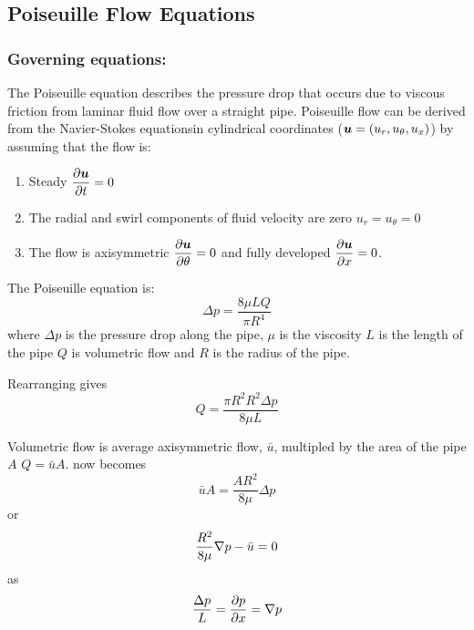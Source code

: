 \subsection{Poiseuille Flow Equations}

\subsubsection{Governing equations:}

The Poiseuille equation describes the pressure drop that occurs due to viscous
friction from laminar fluid flow over a straight pipe. Poiseuille flow can be
derived from the Navier-Stokes equationsin cylindrical coordinates
($\boldsymbol{u}=\left( u_{r},u_{\theta},u_{x} \right)$) by assuming that the flow
is: \begin{enumerate} \setlength{\itemsep}{1pt} \setlength{\parskip}{0pt}
  \setlength{\parsep}{0pt}
\item Steady \ie $ \dfrac{\partial \boldsymbol{u}}{\partial t} =0$
\item The radial and swirl components of fluid velocity are zero \ie
  $u_{r}=u_{\theta}=0$ 
\item The flow is axisymmetric \ie $ \dfrac{\partial \boldsymbol{u}}{\partial \theta} =0$ and fully developed
  \ie $ \dfrac{\partial \boldsymbol{u}}{\partial x} =0$.
\end{enumerate}

The Poiseuille equation is:
\begin{equation}
  \boxed{
    \Delta{p}=\dfrac{8\mu LQ}{\pi R^{4}}
  }
  \label{eqn:Poiseuille_equation}
\end{equation}
where $\Delta{p}$ is the pressure drop along the pipe, $\mu$ is the viscosity $L$
is the length of the pipe $Q$ is volumetric flow and $R$ is the radius of the
pipe. 

Rearranging  gives
\begin{equation}
  Q=\dfrac{\pi R^{2}R^{2}\Delta{p}}{8\mu L}
\end{equation}

Volumetric flow is average axisymmetric flow, $\bar{u}$, multipled by the area
of the pipe $A$ \ie $Q=\bar{u}A$.  now becomes
\begin{equation}
  \bar{u}A=\dfrac{AR^{2}}{8\mu}\Delta{p}
\end{equation}
or 
\begin{equation}
  \dfrac{R^{2}}{8\mu}\gradient{}{p}-\bar{u}=0
\end{equation}
as
\begin{equation}
  \dfrac{\Delta p}{L}=\delby{p}{x}=\gradient{}{p}
\end{equation}


